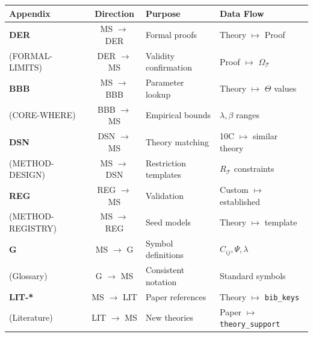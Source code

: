 \begin{tcolorbox}[colback=blue!3!white, colframe=blue!60!black,
    title=\textbf{Connection Architecture: MS $\leftrightarrow$ Other Appendices}]
\begin{center}
\small
\begin{tabular}{|l|c|l|l|}
\hline
\textbf{Appendix} & \textbf{Direction} & \textbf{Purpose} & \textbf{Data Flow} \\
\hline
\textbf{DER} & MS $\rightarrow$ DER & Formal proofs & Theory $\mapsto$ Proof \\
(FORMAL-LIMITS) & DER $\rightarrow$ MS & Validity confirmation & Proof $\mapsto$ $\Omega_\mathcal{T}$ \\
\hline
\textbf{BBB} & MS $\rightarrow$ BBB & Parameter lookup & Theory $\mapsto$ $\Theta$ values \\
(CORE-WHERE) & BBB $\rightarrow$ MS & Empirical bounds & $\lambda, \beta$ ranges \\
\hline
\textbf{DSN} & DSN $\rightarrow$ MS & Theory matching & 10C $\mapsto$ similar theory \\
(METHOD-DESIGN) & MS $\rightarrow$ DSN & Restriction templates & $R_\mathcal{T}$ constraints \\
\hline
\textbf{REG} & REG $\rightarrow$ MS & Validation & Custom $\mapsto$ established \\
(METHOD-REGISTRY) & MS $\rightarrow$ REG & Seed models & Theory $\mapsto$ template \\
\hline
\textbf{G} & MS $\rightarrow$ G & Symbol definitions & $C_{ij}, \Psi, \lambda$ \\
(Glossary) & G $\rightarrow$ MS & Consistent notation & Standard symbols \\
\hline
\textbf{LIT-*} & MS $\rightarrow$ LIT & Paper references & Theory $\mapsto$ \texttt{bib\_keys} \\
(Literature) & LIT $\rightarrow$ MS & New theories & Paper $\mapsto$ \texttt{theory\_support} \\
\hline
\end{tabular}
\end{center}

\end{tcolorbox}

